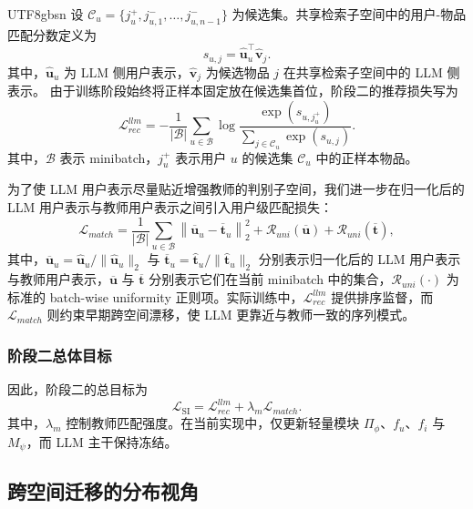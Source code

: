 \documentclass{article}
\begin{document}
\begin{CJK*}{UTF8}{gbsn}
设 $\mathcal{C}_u=\{j_u^{+},j_{u,1}^{-},\dots,j_{u,n-1}^{-}\}$ 为候选集。共享检索子空间中的用户-物品匹配分数定义为
\begin{equation}
s_{u,j}=\hat{\mathbf{u}}_u^{\top}\hat{\mathbf{v}}_j.
\label{eq:stage2_score}
\end{equation}
其中，$\hat{\mathbf{u}}_u$ 为 LLM 侧用户表示，$\hat{\mathbf{v}}_j$ 为候选物品 $j$ 在共享检索子空间中的 LLM 侧表示。
由于训练阶段始终将正样本固定放在候选集首位，阶段二的推荐损失写为
\begin{equation}
\mathcal{L}_{rec}^{llm}
=-\frac{1}{|\mathcal{B}|}\sum_{u\in\mathcal{B}}
\log
\frac{\exp(s_{u,j_u^{+}})}
{\sum_{j\in\mathcal{C}_u}\exp(s_{u,j})}.
\end{equation}
其中，$\mathcal{B}$ 表示 minibatch，$j_u^{+}$ 表示用户 $u$ 的候选集 $\mathcal{C}_u$ 中的正样本物品。

为了使 LLM 用户表示尽量贴近增强教师的判别子空间，我们进一步在归一化后的 LLM 用户表示与教师用户表示之间引入用户级匹配损失：
\begin{equation}
\mathcal{L}_{match}
=
\frac{1}{|\mathcal{B}|}\sum_{u\in\mathcal{B}}
\left\|
\overline{\mathbf{u}}_u-\overline{\mathbf{t}}_u
\right\|_2^2
+\mathcal{R}_{uni}(\overline{\mathbf{u}})
+\mathcal{R}_{uni}(\overline{\mathbf{t}}),
\label{eq:stage2_match}
\end{equation}
其中，$\overline{\mathbf{u}}_u=\hat{\mathbf{u}}_u/\|\hat{\mathbf{u}}_u\|_2$ 与 $\overline{\mathbf{t}}_u=\hat{\mathbf{t}}_u/\|\hat{\mathbf{t}}_u\|_2$ 分别表示归一化后的 LLM 用户表示与教师用户表示，$\overline{\mathbf{u}}$ 与 $\overline{\mathbf{t}}$ 分别表示它们在当前 minibatch 中的集合，$\mathcal{R}_{uni}(\cdot)$ 为标准的 batch-wise uniformity 正则项。实际训练中，$\mathcal{L}_{rec}^{llm}$ 提供排序监督，而 $\mathcal{L}_{match}$ 则约束早期跨空间漂移，使 LLM 更靠近与教师一致的序列模式。

\subsubsection{阶段二总体目标}

因此，阶段二的总目标为
\begin{equation}
\mathcal{L}_{\text{SI}}=\mathcal{L}_{rec}^{llm}+\lambda_m\mathcal{L}_{match}.
\end{equation}
其中，$\lambda_m$ 控制教师匹配强度。在当前实现中，仅更新轻量模块 $\Pi_{\phi}$、$f_u$、$f_i$ 与 $M_{\psi}$，而 LLM 主干保持冻结。

\subsection{跨空间迁移的分布视角}
\label{sec:theory}


\end{CJK*}
\end{document}
